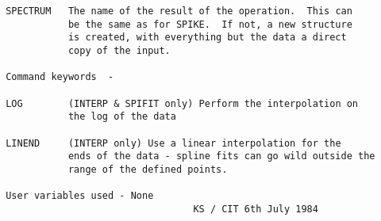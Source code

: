 \begin{description}
\begin{verbatim}
 SPECTRUM   The name of the result of the operation.  This can
            be the same as for SPIKE.  If not, a new structure
            is created, with everything but the data a direct
            copy of the input.

 Command keywords  -

 LOG        (INTERP & SPIFIT only) Perform the interpolation on
            the log of the data

 LINEND     (INTERP only) Use a linear interpolation for the
            ends of the data - spline fits can go wild outside the
            range of the defined points.

 User variables used - None
                                  KS / CIT 6th July 1984
\end{verbatim}
\end{description}
